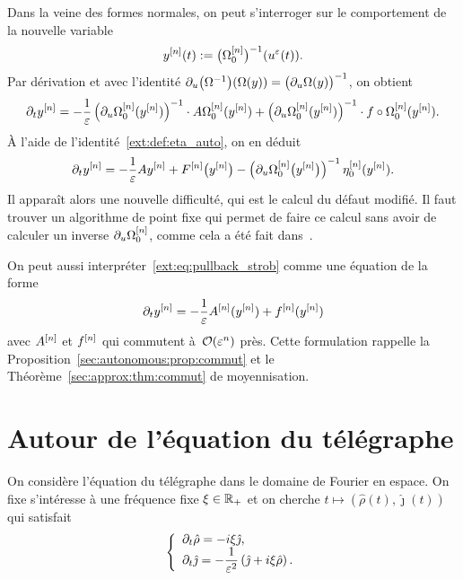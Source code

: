 Dans la veine des formes normales, on peut s'interroger sur le comportement de la nouvelle variable 
\begin{equation*}
    y^{[n]} (t) := \big( \Omega^{[n]} _0 \big)^{-1} (u^\varepsilon(t)) .
\end{equation*}
Par dérivation et avec l'identité $\partial_u \big( \Omega^{-1} \big) (\Omega(y)) = \big( \partial_u \Omega (y) \big)^{-1}$, on obtient 
\begin{equation} \label{ext:eq:pullback_strob}
    \partial_t y^{[n]} 
    = -\frac{1}{\varepsilon} \left( \partial_u \Omega^{[n]} _0 (y^{[n]}) \right)^{-1} \cdot A \Omega^{[n]} _0 (y^{[n]})
    + \left( \partial_u \Omega^{[n]} _0 (y^{[n]}) \right)^{-1} \cdot f \circ \Omega^{[n]} _0 (y^{[n]}) .
\end{equation}
À l'aide de l'identité~\eqref{ext:def:eta_auto}, on en déduit 
\begin{equation} \label{ext:eq:pullback_eta}
    \partial_t y^{[n]} = -\frac{1}{\varepsilon}A y^{[n]} + F^{[n]} \big( y^{[n]} \big)
    - \left( \partial_u \Omega^{[n]} _0 \big(y ^{[n]} \big) \right)^{-1}
        \eta^{[n]} _0 (y^{[n]}) .
\end{equation}
%
Il apparaît alors une nouvelle difficulté, qui est le calcul du défaut modifié. Il faut trouver un algorithme de point fixe qui permet de faire ce calcul sans avoir de calculer un inverse $\partial_u \Omega^{[n]} _0$, comme cela a été fait dans~\cite{chartier.2020.new}.

\begin{FRremark}
    On peut aussi interpréter~\eqref{ext:eq:pullback_strob} comme une équation de la forme 
    \begin{equation*}
        \partial_t y^{[n]} 
        = -\frac{1}{\varepsilon} A^{[n]} (y^{[n]}) + f^{[n]} (y ^{[n]}) 
    \end{equation*}
    avec $A^{[n]}$ et $f^{[n]}$ qui commutent à~$\mathcal{O}(\varepsilon^{n})$ près. Cette formulation rappelle la Proposition~\ref{sec:autonomous:prop:commut} et le Théorème~\ref{sec:approx:thm:commut} de moyennisation. 
\end{FRremark}



\section{Autour de l’équation du télégraphe}
\label{ext:sec:telegraphe}

\newcommand{\myR}{\hat{\rho}}
\newcommand{\myJ}{\hat{\jmath}}


On considère l'équation du télégraphe dans le domaine de Fourier en espace. On fixe s'intéresse à une fréquence fixe $\xi \in \mathbb{R}_+$ et on cherche $t \mapsto (\myR(t),\myJ(t))$ qui satisfait 
\begin{equation*}
    \left\{ \begin{array}{l} \displaystyle 
        \dpt \myR = - i\xi \myJ ,
        \\ \displaystyle
        \dpt \myJ 
        = -\frac{1}{\eps^2} \left( \myJ + i\xi \myR \right) .
    \end{array} \right .
\end{equation*}

